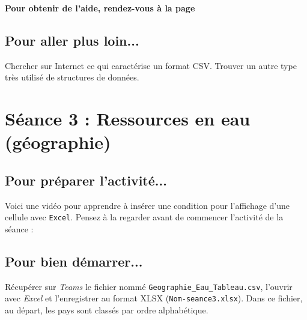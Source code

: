 

\textbf{Pour obtenir de l'aide, rendez-vous à la page \pageref{AideTableur03}}

\subsection{Pour aller plus loin...}

Chercher sur Internet ce qui caractérise un format CSV. Trouver un autre type très utilisé de structures de données.

\vfill
%
%
%
%



\pagebreak

\section{Séance 3 : Ressources en eau (géographie)}\label{ficheTableur4e3}

\subsection{Pour préparer l'activité...}

\vspace{10pt}

Voici une vidéo pour apprendre à insérer une condition pour l'affichage d'une cellule avec \texttt{Excel}. Pensez à la regarder avant de commencer l'activité de la séance :

\begin{center}
\end{center}

\vspace{12pt}

\subsection{Pour bien démarrer...}

\vspace{10pt}

Récupérer sur \emph{Teams} le fichier nommé \texttt{Geographie\_Eau\_Tableau.csv}, l'ouvrir avec \emph{Excel} et l'enregistrer au format XLSX (\texttt{Nom-seance3.xlsx}). Dans ce fichier, au départ, les pays sont classés par ordre alphabétique.\\

